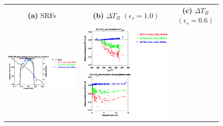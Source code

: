 \begin{figure}[H]
  \centering
  \begin{tabular}{c c c}
    \textsf{\textbf{(a)} SRFs} &
    \textsf{\textbf{(b)} $\Delta T_B$ $(\epsilon_s = 1.0)$} &
    \textsf{\textbf{(c)} $\Delta T_B$ $(\epsilon_s = 0.6)$} \\
    \includegraphics[bb=80 400 280 558,clip,scale=0.85]{graphics/srf/Tset/atms_npp.ch4.osrf.eps} &
    \includegraphics[bb=85 400 260 558,clip,scale=0.85]{graphics/dtb/Tset/e1.0_r0.0/atms_npp.ch4.dTb.eps} & 

\end{tabular}
\end{figure}
